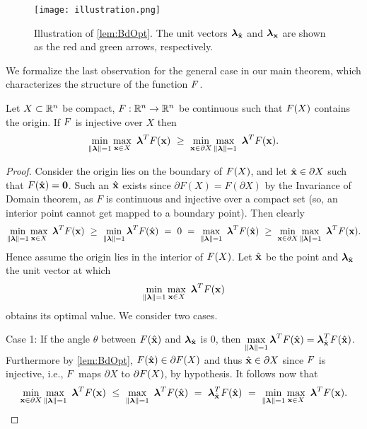 \begin{figure}[htp!]
\begin{center}
  \texttt{[image: illustration.png]}
\end{center}
\caption{\label{fig:illustration}
  Illustration of \cref{lem:BdOpt}.
  The unit vectors $\boldsymbol{\lambda}_{\hat{\mathbf{x}}}$ and $\boldsymbol{\lambda}_{\mathbf{x}}$ are shown as the red and green arrows, respectively.
}
\end{figure}

We formalize the last observation for the general case in our main theorem, which characterizes the structure of the function $F$.

\begin{thm} 
  \label{thm:MainIneq}
  Let $X\subset\mathbb{R}^n$ be compact, $F:\mathbb{R}^n\rightarrow\mathbb{R}^n$ be continuous such that $F(X)$ contains the origin. 
  If $F$ is injective over $X$ then
  \[
  \min\limits_{\lVert\boldsymbol{\lambda}\rVert=1}\max\limits_{\mathbf{x}\in X}\ \boldsymbol{\lambda}^TF(\mathbf{x}) ~\geq~ \min\limits_{\mathbf{x}\in \partial X} \max\limits_{\lVert\boldsymbol{\lambda}\rVert=1}\ \boldsymbol{\lambda}^TF(\mathbf{x}).
  \]
  \begin{proof}
    Consider the origin lies on the boundary of $F(X)$, and let $\hat{\mathbf{x}} \in \partial X$ such that $F(\hat{\mathbf{x}})=\mathbf{0}$. 
    Such an $\hat{\mathbf{x}}$ exists since $\partial F(X) = F(\partial X)$ by the Invariance of Domain theorem, as $F$ is continuous and injective over a compact set (so, an interior point cannot get mapped to a boundary point). 
    Then  clearly
    \[
       \min\limits_{\norm{\vlambda}=1}\max\limits_{\vx\in X}\ \vlambda^T\vF(\vx) ~\geq~
       \min\limits_{\norm{\vlambda}=1}\vlambda^T\vF(\hat{\vx}) ~=~ 0 ~=~
       \max\limits_{\norm{\vlambda}=1}\ \vlambda^T\vF(\hat{\vx}) ~\geq~
       \min\limits_{\vx\in \partial X}\max\limits_{\norm{\vlambda}=1}\ \vlambda^T\vF(\vx).
    \]
    Hence assume the origin lies in the interior of $F(X)$.
    Let $\hat{\mathbf{x}}$ be the point and $\boldsymbol{\lambda}_{\hat{\mathbf{x}}}$ the unit vector at which
    \[
    \min\limits_{\lVert\boldsymbol{\lambda}\rVert=1}\max\limits_{\mathbf{x}\in X}\ \boldsymbol{\lambda}^TF(\mathbf{x})
    \]
    obtains its optimal value.
    We consider two cases.

    Case 1: If the angle $\theta$ between $F(\hat{\mathbf{x}})$ and $\boldsymbol{\lambda}_{\hat{\mathbf{x}}}$ is $0$, then $\displaystyle \max\limits_{\lVert\boldsymbol{\lambda}\rVert=1}\boldsymbol{\lambda}^TF(\hat{\mathbf{x}}) = \boldsymbol{\lambda}_{\hat{\mathbf{x}}}^TF(\hat{\mathbf{x}})$. 
    Furthermore by \cref{lem:BdOpt}, $F(\hat{\mathbf{x}}) \in \partial F(X)$ and thus $\hat{\mathbf{x}}\in \partial X$ since $F$ is injective, i.e., $F$ maps $\partial X$ to $\partial F(X)$, by hypothesis. 
    It follows now that
    \[
      \min\limits_{\vx\in \partial X}\max\limits_{\norm{\vlambda}=1}\ \vlambda^T\vF(\vx) ~\leq~
      \max\limits_{\norm{\vlambda}=1}\ \vlambda^T\vF(\hat{\vx}) ~=~
      \vlambda_{\hat{\vx}}^T\vF(\hat{\vx}) ~=~
      \min\limits_{\norm{\vlambda}=1}\max\limits_{\vx\in X}\ \vlambda^T\vF(\vx).
    \]


\end{proof}
\end{thm}
